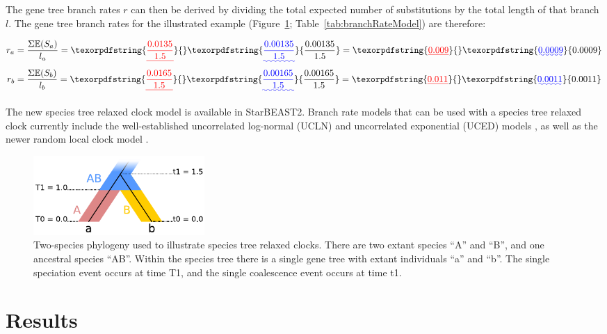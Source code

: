 \documentclass[12pt]{article}
\providecommand{\DIFaddtex}[1]{{\protect\color{blue}\uwave{#1}}} %
\providecommand{\DIFdeltex}[1]{{\protect\color{red}\sout{#1}}}                      %
\providecommand{\DIFaddbegin}{} %
\providecommand{\DIFaddend}{} %
\providecommand{\DIFdelbegin}{} %
\providecommand{\DIFdelend}{} %
\providecommand{\DIFaddbeginFL}{} %
\providecommand{\DIFaddendFL}{} %
\providecommand{\DIFdelbeginFL}{} %
\providecommand{\DIFdelendFL}{} %
\providecommand{\DIFadd}[1]{\texorpdfstring{\DIFaddtex{#1}}{#1}} %
\providecommand{\DIFdel}[1]{\texorpdfstring{\DIFdeltex{#1}}{}} %
\begin{document}
The gene tree branch rates $r$ can then be derived by dividing the total
expected number of substitutions by the total length of that branch $l$. The
gene tree branch rates for the illustrated example
(Figure~\ref{fig:branchRateModel}; Table~\ref{tab:branchRateModel}) are
therefore:

\begin{align}
r_a &= \frac{\Sigma \mathbb{E}(S_a)}{l_a} = \DIFdelbegin \DIFdel{\frac{0.0135}{1.5} }\DIFdelend \DIFaddbegin \DIFadd{\frac{0.00135}{1.5} }\DIFaddend = \DIFdelbegin \DIFdel{0.009}\DIFdelend \DIFaddbegin \DIFadd{0.0009}\DIFaddend \\
r_b &= \frac{\Sigma \mathbb{E}(S_b)}{l_b} = \DIFdelbegin \DIFdel{\frac{0.0165}{1.5} }\DIFdelend \DIFaddbegin \DIFadd{\frac{0.00165}{1.5} }\DIFaddend = \DIFdelbegin \DIFdel{0.011
}\DIFdelend \DIFaddbegin \DIFadd{0.0011
}\DIFaddend \end{align}

The new species tree relaxed clock model is available in StarBEAST2. Branch rate
models that can be used with a species tree relaxed clock currently include the
well-established uncorrelated log-normal (UCLN) and uncorrelated exponential
(UCED) models \citep{10.1371/journal.pbio.0040088}, as well as the newer random
local clock model \citep{Drummond2010}.

\begin{figure}[htb!]
\centering
\DIFdelbeginFL %
\DIFdelendFL \DIFaddbeginFL \includegraphics[width=65mm]{relaxed_clock.pdf}
\DIFaddendFL \caption
{Two-species phylogeny used to illustrate species tree relaxed
clocks. There are two extant species ``A'' and ``B'', and one ancestral species ``AB''.
Within the species tree there is a single gene tree with extant individuals ``a''
and ``b''. The single speciation event occurs at time T1, and the single coalescence
event occurs at time t1.}
\label{fig:branchRateModel}
\end{figure}

\section{Results \DIFaddbegin \DIFadd{and Discussion}\DIFaddend }
\end{document}
